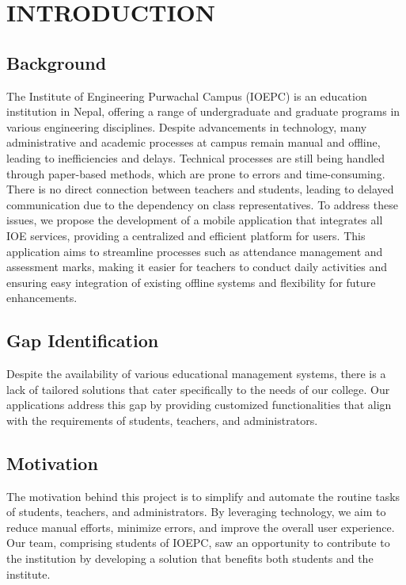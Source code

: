 \chapter{INTRODUCTION}

\section{Background}
The Institute of Engineering Purwachal Campus (IOEPC) is an education institution in Nepal, offering a range of undergraduate and graduate programs in various engineering disciplines. Despite advancements in technology, many administrative and academic processes at campus remain manual and offline, leading to inefficiencies and delays. Technical processes are still being handled through paper-based methods, which are prone to errors and time-consuming. There is no direct connection between teachers and students, leading to delayed communication due to the dependency on class representatives. To address these issues, we propose the development of a mobile application that integrates all IOE services, providing a centralized and efficient platform for users. This application aims to streamline processes such as attendance management and assessment marks, making it easier for teachers to conduct daily activities and ensuring easy integration of existing offline systems and flexibility for future enhancements.

\section{Gap Identification}
Despite the availability of various educational management systems, there is a lack of tailored solutions that cater specifically to the needs of our college. Our applications address this gap by providing customized functionalities that align with the requirements of students, teachers, and administrators.

\section{Motivation}
The motivation behind this project is to simplify and automate the routine tasks of students, teachers, and administrators. By leveraging technology, we aim to reduce manual efforts, minimize errors, and improve the overall user experience. Our team, comprising students of IOEPC, saw an opportunity to contribute to the institution by developing a solution that benefits both students and the institute.

